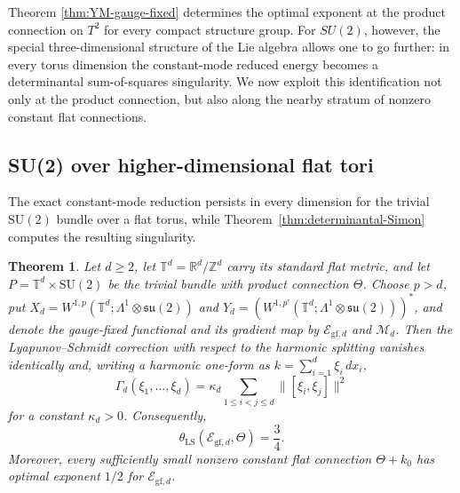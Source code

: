 \documentclass[11pt]{article}
\newtheorem{theorem}{Theorem}[section]
\theoremstyle{definition}
\theoremstyle{remark}
\begin{document}
Theorem \ref{thm:YM-gauge-fixed} determines the optimal exponent at the product connection on $T^2$ for every compact structure group. For $SU(2)$, however, the special three-dimensional structure of the Lie algebra allows one to go further: in every torus dimension the constant-mode reduced energy becomes a determinantal sum-of-squares singularity. We now exploit this identification not only at the product connection, but also along the nearby stratum of nonzero constant flat connections.

\subsection{SU(2) over higher-dimensional flat tori}

The exact constant-mode reduction persists in every dimension for the trivial $\mathrm{SU}(2)$ bundle over a flat torus, while Theorem~\ref{thm:determinantal-Simon} computes the resulting singularity.

\begin{theorem}\label{thm:YM-higher-torus}
Let $d\ge2$, let $\mathbb T^d=\mathbb R^d/\mathbb Z^d$ carry its standard flat metric, and let $P=\mathbb T^d\times\mathrm{SU}(2)$ be the trivial bundle with product connection $\Theta$. Choose $p>d$, put
$X_d=W^{1,p}(\mathbb T^d;\Lambda^1\otimes\mathfrak{su}(2))$ and
$Y_d=(W^{1,p'}(\mathbb T^d;\Lambda^1\otimes\mathfrak{su}(2)))^*$, and denote the gauge-fixed functional and its gradient map by $\mathcal E_{\mathrm{gf},d}$ and $\mathcal M_d$. Then the Lyapunov--Schmidt correction with respect to the harmonic splitting vanishes identically and, writing a harmonic one-form as $k=\sum_{i=1}^d\xi_i\,dx_i$,
$$
\Gamma_d(\xi_1,\ldots,\xi_d)
=\kappa_d\sum_{1\le i<j\le d}\|[\xi_i,\xi_j]\|^2
$$
for a constant $\kappa_d>0$. Consequently,
$$
\theta_{\mathrm{LS}}(\mathcal E_{\mathrm{gf},d},\Theta)=\frac34.
$$
Moreover, every sufficiently small nonzero constant flat connection $\Theta+k_0$ has optimal exponent $1/2$ for $\mathcal E_{\mathrm{gf},d}$.
\end{theorem}
\end{document}

